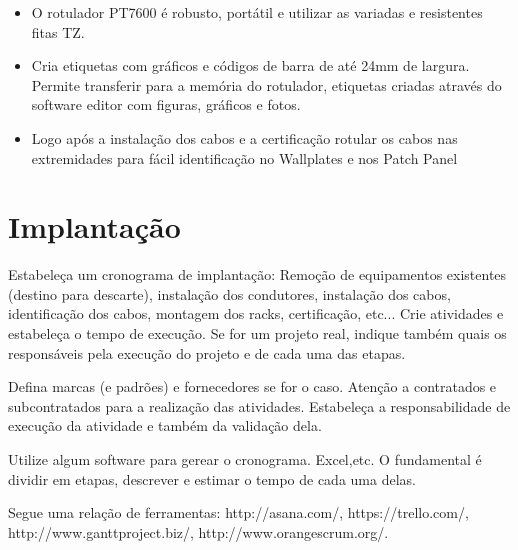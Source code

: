 \documentclass[	DIV=calc,%
							paper=a4,%
							fontsize=12pt,%
							onecolumn]{scrartcl}	 					%
\begin{document}
\begin{itemize}
	\item O rotulador PT7600 é robusto, portátil e utilizar as variadas e resistentes fitas TZ.
	\item Cria etiquetas com gráficos e códigos de barra de até 24mm de largura. Permite transferir para a memória do rotulador, etiquetas criadas através do software editor com figuras, gráficos e fotos.
	\item Logo após a instalação dos cabos e a certificação rotular os cabos nas extremidades para fácil identificação no Wallplates e nos Patch Panel
\end{itemize}

\section{Implantação}
Estabeleça um cronograma de implantação:
Remoção de equipamentos existentes (destino para descarte), instalação dos condutores, instalação dos cabos, 
identificação dos cabos, montagem dos racks, certificação, etc... Crie atividades e estabeleça o tempo de execução. Se for um projeto real, indique também quais os responsáveis pela execução do projeto e de cada uma das etapas.

Defina marcas (e padrões) e fornecedores se for o caso. Atenção a contratados e subcontratados para a realização das atividades. Estabeleça a responsabilidade de execução da atividade e também da validação dela.

Utilize algum software para gerear o cronograma. Excel,etc. O fundamental é dividir em etapas, descrever e estimar o tempo de cada uma delas.

Segue uma relação de ferramentas:
http://asana.com/, 
https://trello.com/, 
http://www.ganttproject.biz/, 
http://www.orangescrum.org/. 
\end{document}
